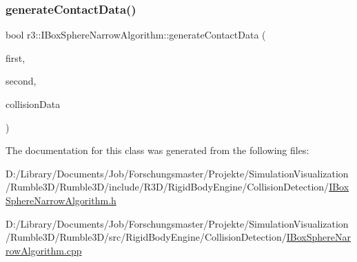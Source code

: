 \subsubsection{\texorpdfstring{generate\+Contact\+Data()}{generateContactData()}\hspace{0.1cm}{\footnotesize\ttfamily [3/3]}}
{\footnotesize\ttfamily bool r3\+::\+I\+Box\+Sphere\+Narrow\+Algorithm\+::generate\+Contact\+Data (\begin{DoxyParamCaption}\item[{\mbox{\hyperlink{classr3_1_1_collision_sphere}{Collision\+Sphere}} $\ast$}]{first,  }\item[{\mbox{\hyperlink{classr3_1_1_collision_box}{Collision\+Box}} $\ast$}]{second,  }\item[{\mbox{\hyperlink{classr3_1_1_collision_data}{Collision\+Data}} \&}]{collision\+Data }\end{DoxyParamCaption})\hspace{0.3cm}{\ttfamily [protected]}}



The documentation for this class was generated from the following files\+:\begin{DoxyCompactItemize}
\item 
D\+:/\+Library/\+Documents/\+Job/\+Forschungsmaster/\+Projekte/\+Simulation\+Visualization/\+Rumble3\+D/\+Rumble3\+D/include/\+R3\+D/\+Rigid\+Body\+Engine/\+Collision\+Detection/\mbox{\hyperlink{_i_box_sphere_narrow_algorithm_8h}{I\+Box\+Sphere\+Narrow\+Algorithm.\+h}}\item 
D\+:/\+Library/\+Documents/\+Job/\+Forschungsmaster/\+Projekte/\+Simulation\+Visualization/\+Rumble3\+D/\+Rumble3\+D/src/\+Rigid\+Body\+Engine/\+Collision\+Detection/\mbox{\hyperlink{_i_box_sphere_narrow_algorithm_8cpp}{I\+Box\+Sphere\+Narrow\+Algorithm.\+cpp}}\end{DoxyCompactItemize}
